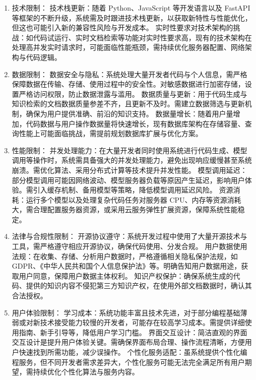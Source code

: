 \documentclass[
    report,     %
    oneside,    %
    UTF8,       %
    zihao=-4    %
]{config} %
\begin{document}
\begin{enumerate}[label=(\arabic*)]
\item 技术限制：
技术栈更新：随着 Python、JavaScript 等开发语言以及 FastAPI 等框架的不断升级，系统需及时跟进技术栈更新，以获取新特性与性能优化，但这也可能引入新的兼容性风险与开发成本。
实时性要求对技术架构的挑战：如代码试运行、实时文档检索等功能对实时性要求高，现有的技术架构在处理高并发实时请求时，可能面临性能瓶颈，需持续优化服务器配置、网络架构与代码逻辑。
\item 数据限制：
数据安全与隐私：系统处理大量开发者代码与个人信息，需严格保障数据在传输、存储、使用过程中的安全性。对敏感数据进行加密存储，设置严格访问权限，防止数据泄露与滥用。
数据质量与更新：用于代码生成与知识检索的文档数据质量参差不齐，且更新不及时。需建立数据筛选与更新机制，确保为用户提供准确、前沿的知识支持。
数据量增长：随着用户量增加，代码数据与用户操作数据量将快速增长，现有数据库架构在存储容量、查询性能上可能面临挑战，需提前规划数据库扩展与优化方案。
\item 性能限制：
并发处理能力：在大量开发者同时使用系统进行代码生成、模型调用等操作时，系统需具备强大的并发处理能力，避免出现响应缓慢甚至系统崩溃。需优化算法、采用分布式计算等技术提升并发性能。
模型调用延迟：部分模型调用可能因网络波动、模型服务器负载等原因产生延迟，影响用户体验。需引入缓存机制、备用模型等策略，降低模型调用延迟风险。
资源消耗：运行多个模型以及处理复杂代码任务对服务器 CPU、内存等资源消耗大，需合理配置服务器资源，或采用云服务弹性扩展资源，保障系统性能稳定。
\item 法律与合规性限制：
开源协议遵守：系统开发过程中使用了大量开源技术与工具，需严格遵守相应开源协议，确保代码使用、分发合规。
用户数据使用法规：在收集、存储、分析用户数据时，严格遵循相关隐私保护法规，如 GDPR、《中华人民共和国个人信息保护法》等。明确告知用户数据用途，获取用户同意，保障用户数据主体权利。
知识产权保护：确保系统生成的代码、提供的知识内容不侵犯第三方知识产权，在使用外部文档数据时，确认其合法授权。
\item 用户体验限制：
学习成本：系统功能丰富且技术先进，对于部分编程基础薄弱或对新技术接受能力较慢的开发者，可能存在较高学习成本。需提供详细使用指南、新手引导等，降低用户学习门槛。
界面交互设计：简洁直观的界面交互设计是提升用户体验关键。需确保界面布局合理、操作流程清晰，方便用户快速找到所需功能，减少误操作。
个性化服务适配：虽系统提供个性化编程服务，但不同开发者需求差异大，个性化服务可能无法完全满足所有用户期望，需持续优化个性化算法与服务内容。
\end{enumerate}
\end{document}
